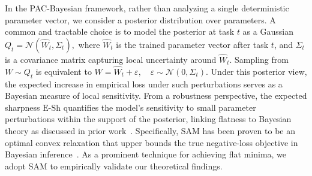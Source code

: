 \documentclass[10pt]{article} %
\begin{document}


In the PAC-Bayesian framework, rather than analyzing a single deterministic parameter vector, we consider a posterior distribution over parameters.  A common and tractable choice is to model the posterior at task \(t\) as a Gaussian
 $ Q_t = \mathcal{N}(\hat{W}_t, \Sigma_t),$
 where \(\hat{W}_t\) is the trained parameter vector after task \(t\), and \(\Sigma_t\) is  a covariance matrix capturing local uncertainty around \(\hat{W}_t\). Sampling  from \(W \sim Q_t\) is equivalent to 
 $ W = \hat{W}_t + \varepsilon,
 \quad
 \varepsilon \sim \mathcal{N}(0, \Sigma_t).$
Under this posterior view, the expected increase in empirical loss under such perturbations serves as a Bayesian measure of local sensitivity.
From a robustness perspective, the expected sharpness $\mathrm{E\text{-}Sh}$ quantifies the model's sensitivity to small parameter perturbations within the support of the posterior, linking flatness to Bayesian theory as discussed in prior work~\citep{mllenhoff2023sam}. Specifically, SAM has been proven to be an optimal convex relaxation that upper bounds the true negative-loss objective in Bayesian inference~\citep{mllenhoff2023sam}. As a prominent technique for achieving flat minima, we adopt SAM to empirically validate our theoretical findings.
\end{document}
